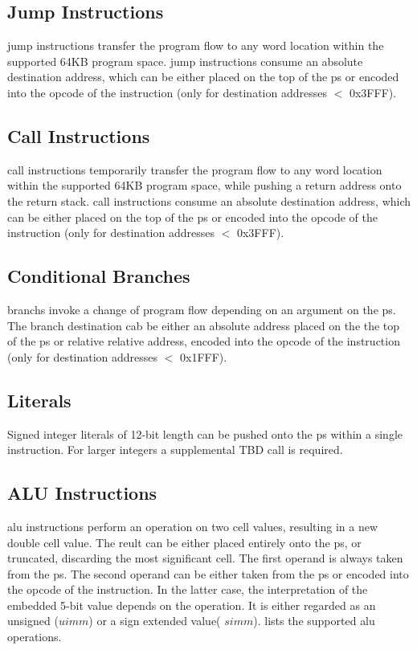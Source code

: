 \subsection{Jump Instructions}
\label{opcodes:jump}

\Gls{jump} instructions transfer the program flow to any \gls{word}
location within the supported 64KB program space. \Gls{jump} instructions consume an absolute
destination address, which can be either placed on the top of the \Gls{ps} or encoded
into the opcode of the instruction (only for destination addresses $<$ 0x3FFF).

\subsection{Call Instructions}
\label{opcodes:call}

\Gls{call} instructions temporarily transfer the program flow to any \gls{word}
location within the supported 64KB program space, while pushing a return address onto
the return stack. \Gls{call} instructions consume an absolute
destination address, which can be either placed on the top of the \Gls{ps} or encoded
into the opcode of the instruction (only for destination addresses $<$ 0x3FFF).

\subsection{Conditional Branches}
\label{opcodes:branch}

\Glspl{branch} invoke a change of program flow depending on an argument on the
\gls{ps}. The branch destination cab be either an absolute address placed on the the top of  
the \Gls{ps} or relative relative address, encoded into the opcode of the instruction
(only for destination addresses $<$ 0x1FFF).

\subsection{Literals}
\label{opcodes:literal}

Signed integer \glspl{literal} of 12-bit length can be pushed onto the \gls{ps} within
a single instruction. For larger integers a supplemental TBD \gls{call} is required.

\subsection{ALU Instructions}
\label{opcodes:alu}
\Gls{alu} instructions perform an operation on two \gls{cell} values, resulting in a new double 
\gls{cell} value. The reult can be either placed entirely onto the \gls{ps}, or truncated, discarding
the most significant \gls{cell}. The first operand is always taken from the \Gls{ps}. The second operand can be
either taken from the \Gls{ps} or encoded into the opcode of the instruction. In the latter case,
the interpretation of the embedded 5-bit value depends on the operation. It is either regarded as an unsigned
($uimm$) or a sign extended value( $simm$).  lists the supported \gls{alu} operations.

